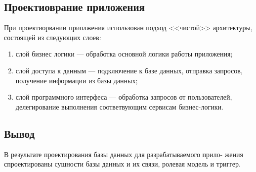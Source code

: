 \subsection{Проектиоврание приложения}

При проектиорвании приолжения использован подход <<чистой>>\cite{clean-code} архитектуры, состоящей из следующих слоев:
\begin{enumerate}
	\item слой бизнес логики --- обработка основной логики работы приложения;
	\item слой доступа к данным --- подключение к базе данных, отправка запросов, получение информации из базы данных;
	\item слой программного интерфеса --- обработка запросов от пользователей, делегирование выполнения соответвующим сервисам бизнес-логики.
\end{enumerate}

\subsection{Вывод}

В результате проектирования базы данных для разрабатываемого прило-
жения спроектированы сущности базы данных и их связи, ролевая модель и триггер.

\pagebreak
